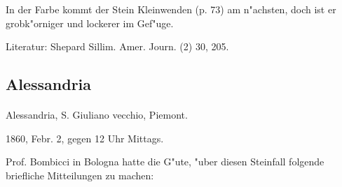 \documentclass[a4paper, 11pt, oneside]{article}
\begin{document}
In der Farbe kommt der Stein Kleinwenden (p. 73) am n"achsten, doch ist er grobk"orniger und lockerer im Gef"uge.

Literatur: Shepard Sillim. Amer. Journ. (2) 30, 205.

\subsection{Alessandria}
\normalsize
\paragraph{}
Alessandria, S. Giuliano vecchio, Piemont.

1860, Febr. 2, gegen 12 Uhr Mittags.

Prof. Bombicci in Bologna hatte die G"ute, "uber diesen Steinfall folgende briefliche Mitteilungen zu machen:
\end{document}
